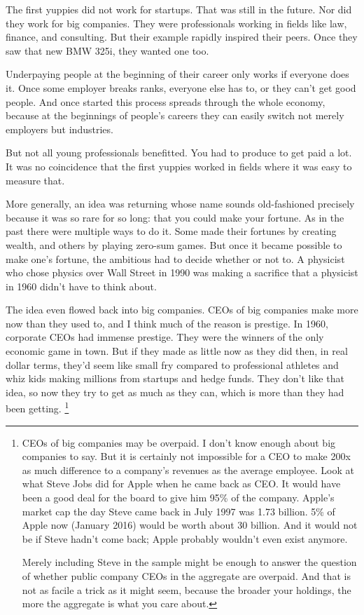 \documentclass[12pt]{book}
\begin{document}
The first yuppies did not work for startups. That was still in the
future. Nor did they work for big companies. They were professionals
working in fields like law, finance, and consulting. But their example
rapidly inspired their peers. Once they saw that new BMW 325i, they
wanted one too.

Underpaying people at the beginning of their career only works if
everyone does it. Once some employer breaks ranks, everyone else has to,
or they can't get good people. And once started this process spreads
through the whole economy, because at the beginnings of people's careers
they can easily switch not merely employers but industries.

But not all young professionals benefitted. You had to produce to get
paid a lot. It was no coincidence that the first yuppies worked in
fields where it was easy to measure that.

More generally, an idea was returning whose name sounds old-fashioned
precisely because it was so rare for so long: that you could make your
fortune. As in the past there were multiple ways to do it. Some made
their fortunes by creating wealth, and others by playing zero-sum games.
But once it became possible to make one's fortune, the ambitious had to
decide whether or not to. A physicist who chose physics over Wall Street
in 1990 was making a sacrifice that a physicist in 1960 didn't have to
think about.

The idea even flowed back into big companies. CEOs of big companies make
more now than they used to, and I think much of the reason is prestige.
In 1960, corporate CEOs had immense prestige. They were the winners of
the only economic game in town. But if they made as little now as they
did then, in real dollar terms, they'd seem like small fry compared to
professional athletes and whiz kids making millions from startups and
hedge funds. They don't like that idea, so now they try to get as much
as they can, which is more than they had been getting.
\footnote{CEOs of big companies may be overpaid. I don't know enough
about big companies to say. But it is certainly not impossible for a CEO
to make 200x as much difference to a company's revenues as the average
employee. Look at what Steve Jobs did for Apple when he came back as
CEO. It would have been a good deal for the board to give him 95\% of
the company. Apple's market cap the day Steve came back in July 1997 was
1.73 billion. 5\% of Apple now (January 2016) would be worth about 30
billion. And it would not be if Steve hadn't come back; Apple probably
wouldn't even exist anymore.

Merely including Steve in the sample might be enough to answer the
question of whether public company CEOs in the aggregate are overpaid.
And that is not as facile a trick as it might seem, because the broader
your holdings, the more the aggregate is what you care about.}
\end{document}
